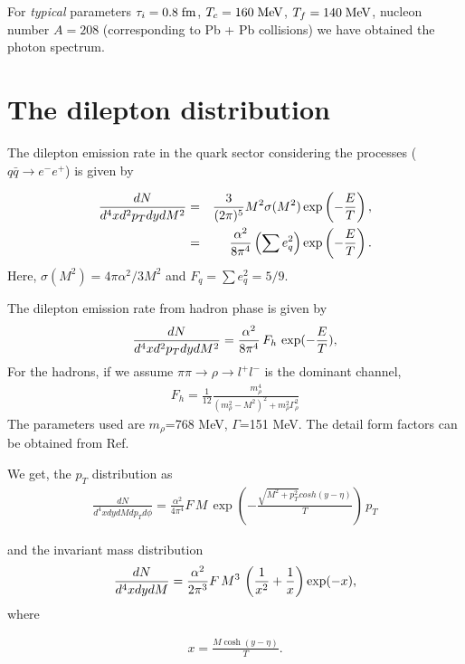 For {\em typical} parameters 
%
$\tau_i = 0.8\;\mbox{fm}$, $T_c = 160\;\mbox{MeV}$, $T_f = 140\;\mbox{MeV}$, 
%
nucleon number $A=208$ (corresponding to Pb + Pb collisions)
we have obtained the photon spectrum.


\section{The dilepton distribution}

 The dilepton emission rate in the quark sector considering the 
processes ($q \bar q \rightarrow e^- e^+$)
is given \cite{KAJA,VOGT} by 

\begin{eqnarray}\label{}
 {dN \over d^4x d^2p_T dy dM^2}
&=& \frac{3}{(2\pi)^5} M^2 \sigma(M^2)
        \exp\left(-\frac{E}{T}\right), \nonumber \\
&=& \frac{\alpha^2}{8\pi^4} \left(\sum e_q^2\right) 
        \exp\left(-\frac{E}{T}\right).
\end{eqnarray}
Here, $\sigma(M^2)=4\pi\alpha^2/3M^2$ and $F_q = \sum e_q^2 = 5/9$.

The dilepton emission rate from hadron phase is given by
\begin{eqnarray}\label{}
\frac{dN}{d^4x d^2p_T dy dM^2} = \frac{\alpha^2}{8\pi^4}\, F_h \,
 \exp(-{E\over T}),
\end{eqnarray}
For the hadrons, if we assume 
$\pi\pi \rightarrow \rho \rightarrow l^+l^-$ is the dominant channel, 
\begin{eqnarray}\label{}
F_h = \frac{1}{12} \frac{m_\rho^4}{(m_\rho^2-M^2)^2 + m_\rho^2 \Gamma_\rho^2}
\end{eqnarray}
The parameters used are $m_\rho$=768 MeV, $\Gamma$=151 MeV. The detail
form factors can be obtained from Ref.~\cite{GALE}

We get, the $p_T$ distribution as
\begin{eqnarray}\label{}
\frac{dN}{d^4x dy dM dp_T d\phi} = \frac{\alpha^2}{4\pi^4}  F \, M \,
   \exp\left(-\frac{ \sqrt{M^2 + p_T^2} cosh (y-\eta)}{T}\right) \, p_T
\end{eqnarray}

and the invariant mass distribution 
\begin{eqnarray}\label{}
\frac{dN}{d^4x dy dM} = \frac{\alpha^2}{2\pi^3} F \, M^3 \,
\left({1\over x^2} + {1\over x}\right) \exp(-x),
\end{eqnarray}
where

\begin{eqnarray}\label{}
x=\frac{ M \cosh (y-\eta)}{T}.
\end{eqnarray}

